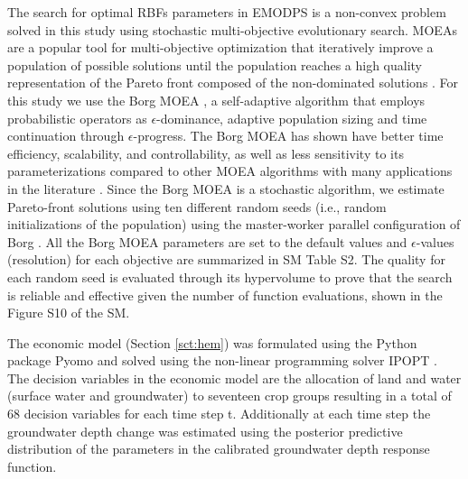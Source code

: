 \documentclass[a4paper,fleqn]{cas-sc}
\begin{document}
The search for optimal RBFs parameters in EMODPS is a non-convex problem \citep{giuliani_curses_2016} solved in this study using stochastic multi-objective evolutionary search. MOEAs are a popular tool for multi-objective optimization that iteratively improve a population of possible solutions  until the population reaches a high quality representation of the Pareto front composed of the non-dominated solutions \citep{coello_evolutionary_2007}.  For this study we use the Borg MOEA \citep{hadka_borg_2013}, a self-adaptive algorithm that employs probabilistic operators as $\epsilon$-dominance, adaptive population sizing and time continuation through $\epsilon$-progress. The Borg MOEA has shown have better time efficiency, scalability, and controllability, as well as less sensitivity to its parameterizations compared to other MOEA algorithms with many applications in the literature \citep{reed_evolutionary_2013,gupta_can_2020,zatarain_salazar_balancing_2017,seyedashraf_assisting_2023,al-jawad_reservoir_2017}. Since the Borg MOEA is a stochastic algorithm, we estimate Pareto-front solutions using ten different random seeds (i.e., random initializations of the population) using the master-worker parallel configuration of Borg \citep{hadka_large-scale_2015}. All the Borg MOEA parameters are set to the default values \citep{hadka_borg_2013} and $\epsilon$-values (resolution) for each objective are summarized in SM Table S2. The quality for each random seed is evaluated through its hypervolume \citep{hadka_diagnostic_2012} to prove that the search is reliable and effective given the number of function evaluations, shown in the Figure S10 of the SM.

The economic model (Section \ref{sct:hem}) was formulated using the Python package Pyomo \citep{hart_pyomo_2011} and solved using the non-linear programming solver IPOPT \citep{wachter_implementation_2006}. The decision variables in the economic model are the allocation of land and water (surface water and groundwater) to seventeen crop groups resulting in a total of 68 decision variables for each time step t. Additionally at each time step the groundwater depth change was estimated using the posterior predictive distribution of the parameters in the calibrated groundwater depth response function.
\end{document}
